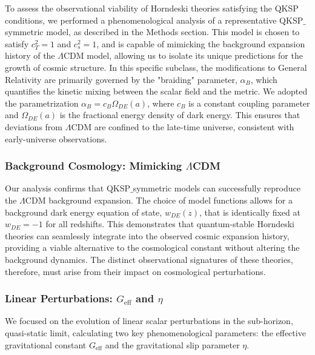 \documentclass[twocolumn]{aastex631}
\begin{document}
To assess the observational viability of Horndeski theories satisfying the QKSP conditions, we performed a phenomenological analysis of a representative QKSP\ensuremath{\_}symmetric model, as described in the Methods section. This model is chosen to satisfy $c_T^2=1$ and $c_s^2=1$, and is capable of mimicking the background expansion history of the $\Lambda$CDM model, allowing us to isolate its unique predictions for the growth of cosmic structure. In this specific subclass, the modifications to General Relativity are primarily governed by the "braiding" parameter, $\alpha_B$, which quantifies the kinetic mixing between the scalar field and the metric. We adopted the parametrization $\alpha_B = c_B \Omega_{DE}(a)$, where $c_B$ is a constant coupling parameter and $\Omega_{DE}(a)$ is the fractional energy density of dark energy. This ensures that deviations from $\Lambda$CDM are confined to the late-time universe, consistent with early-universe observations.

\subsubsection{Background Cosmology: Mimicking $\Lambda$CDM}
Our analysis confirms that QKSP\ensuremath{\_}symmetric models can successfully reproduce the $\Lambda$CDM background expansion. The choice of model functions allows for a background dark energy equation of state, $w_{DE}(z)$, that is identically fixed at $w_{DE}=-1$ for all redshifts. This demonstrates that quantum-stable Horndeski theories can seamlessly integrate into the observed cosmic expansion history, providing a viable alternative to the cosmological constant without altering the background dynamics. The distinct observational signatures of these theories, therefore, must arise from their impact on cosmological perturbations.

\subsubsection{Linear Perturbations: $G_{\text{eff}}$ and $\eta$}
We focused on the evolution of linear scalar perturbations in the sub-horizon, quasi-static limit, calculating two key phenomenological parameters: the effective gravitational constant $G_{\text{eff}}$ and the gravitational slip parameter $\eta$.
\end{document}
